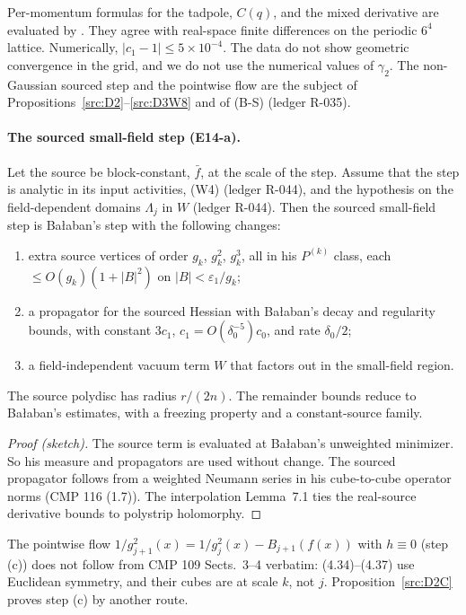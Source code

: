 Per-momentum formulas for the tadpole, $C(q)$, and the mixed derivative are evaluated by . They agree with real-space finite differences on the periodic $6^4$ lattice. Numerically, $|c_1-1|\le5\times10^{-4}$. The data do not show geometric convergence in the grid, and we do not use the numerical values of $\gamma_2$. The non-Gaussian sourced step and the pointwise flow are the subject of Propositions~\ref{src:D2}--\ref{src:D3W8} and of (B-S) (ledger R-035).

\paragraph{The sourced small-field step (E14-a).}

\begin{proposition}\label{src:D2}
Let the source be block-constant, $\bar f$, at the scale of the step. Assume that the step is analytic in its input activities, (W4) (ledger R-044), and the hypothesis on the field-dependent domains $\Lambda_j$ in $W$ (ledger R-044). Then the sourced small-field step is Ba{\l}aban's step with the following changes:
\begin{enumerate}
\item[(i)] extra source vertices of order $g_k$, $g_k^2$, $g_k^3$, all in his $P^{(k)}$ class, each $\le O(g_k)(1+|B|^2)$ on $|B|<\varepsilon_1/g_k$;
\item[(ii)] a propagator for the sourced Hessian with Ba{\l}aban's decay and regularity bounds, with constant $3c_1$, $c_1=O(\delta_0^{-5})c_0$, and rate $\delta_0/2$;
\item[(iii)] a field-independent vacuum term $W$ that factors out in the small-field region.
\end{enumerate}
The source polydisc has radius $r/(2n)$. The remainder bounds reduce to Ba{\l}aban's estimates, with a freezing property and a constant-source family.
\end{proposition}

\begin{proof}[Proof (sketch)]
The source term is evaluated at Ba{\l}aban's unweighted minimizer. So his measure and propagators are used without change. The sourced propagator follows from a weighted Neumann series in his cube-to-cube operator norms (CMP 116 (1.7)). The interpolation Lemma~7.1 ties the real-source derivative bounds to polystrip holomorphy.
\end{proof}

The pointwise flow $1/g_{j+1}^2(x)=1/g_j^2(x)-B_{j+1}(f(x))$ with $h\equiv0$ (step (c)) does not follow from CMP 109 Sects.~3--4 verbatim: (4.34)--(4.37) use Euclidean symmetry, and their cubes are at scale $k$, not $j$. Proposition~\ref{src:D2C} proves step (c) by another route.

